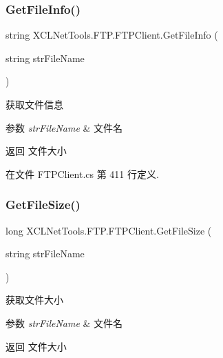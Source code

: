 \subsubsection{\texorpdfstring{Get\+File\+Info()}{GetFileInfo()}}
{\footnotesize\ttfamily string X\+C\+L\+Net\+Tools.\+F\+T\+P.\+F\+T\+P\+Client.\+Get\+File\+Info (\begin{DoxyParamCaption}\item[{string}]{str\+File\+Name }\end{DoxyParamCaption})}



获取文件信息 


\begin{DoxyParams}{参数}
{\em str\+File\+Name} & 文件名\\
\hline
\end{DoxyParams}
\begin{DoxyReturn}{返回}
文件大小
\end{DoxyReturn}


在文件 F\+T\+P\+Client.\+cs 第 411 行定义.

\mbox{\label{class_x_c_l_net_tools_1_1_f_t_p_1_1_f_t_p_client_a39be7d18214835a62484226fc12e2061}} 
\subsubsection{\texorpdfstring{Get\+File\+Size()}{GetFileSize()}}
{\footnotesize\ttfamily long X\+C\+L\+Net\+Tools.\+F\+T\+P.\+F\+T\+P\+Client.\+Get\+File\+Size (\begin{DoxyParamCaption}\item[{string}]{str\+File\+Name }\end{DoxyParamCaption})}



获取文件大小 


\begin{DoxyParams}{参数}
{\em str\+File\+Name} & 文件名\\
\hline
\end{DoxyParams}
\begin{DoxyReturn}{返回}
文件大小
\end{DoxyReturn}


